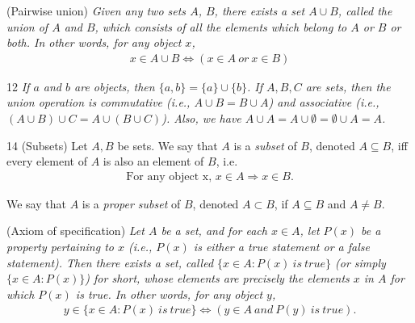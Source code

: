 \begin{axiom}
    \label{ax-pairwise-union}
    (Pairwise union) \emph{Given any two sets $A$, $B$, there exists a set $A\cup B$, called the union of $A$ and $B$, which consists of all the elements which belong to $A$ or $B$ or both. In other words, for any object $x$,}
    \begin{align*}
        x\in A\cup B \iff (x\in A~or~x\in B)
    \end{align*}
\end{axiom}

\begin{lemma}{12}
    \label{union-properties}
    \emph{If $a$ and $b$ are objects, then $\{a, b\} = \{a\}\cup \{b\}$. If $A, B, C$ are sets, then the union operation
    is commutative  (i.e., $A\cup B = B\cup A$) and associative (i.e., $(A\cup B)\cup C = A\cup (B\cup C)$). Also, we have
    $A\cup A = A\cup \emptyset = \emptyset \cup A = A$.}
\end{lemma}

\begin{definition}{14}
    \label{subset}
    (Subsets) Let $A,B$ be sets. We say that $A$ is a \emph{subset} of $B$, denoted $A\subseteq B$, iff every element of $A$ is also an element of $B$, i.e.
    \begin{align*}
        \text{For any object x,~}x\in A \Rightarrow x\in B.
    \end{align*}

    We say that $A$ is a \emph{proper subset} of $B$, denoted $A\subset B$, if $A\subseteq B$ and $A\neq B$.
\end{definition}

\begin{axiom}
    \label{ax-specification}
    (Axiom of specification) \emph{Let $A$ be a set, and for each $x\in A$, let $P(x)$ be a property pertaining to $x$ (i.e., $P(x)$ is either a true statement or a false statement). Then there exists a set, called $\{x\in A: P(x)~is~true\}$ (or simply $\{x\in A: P(x)\}$) for short, whose elements are precisely the elements $x$ in $A$ for which $P(x)$ is true. In other words, for any object $y$,}\begin{align*}
        y\in \{x\in A: P(x)~is~true\} \iff (y\in A~and~P(y)~is~true).
    \end{align*}
\end{axiom}

